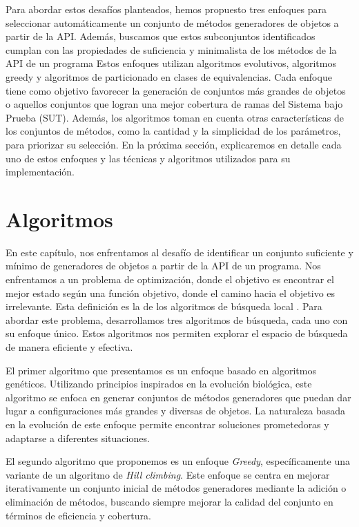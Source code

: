 Para abordar estos desafíos planteados, hemos propuesto tres enfoques para seleccionar automáticamente un conjunto de métodos generadores de objetos a partir de la API. Además, buscamos que estos subconjuntos identificados cumplan con las propiedades de suficiencia y minimalista de los métodos de la API de un programa  Estos enfoques utilizan algoritmos evolutivos, algoritmos greedy y algoritmos de particionado en clases de equivalencias. Cada enfoque tiene como objetivo favorecer la generación de conjuntos más grandes de objetos o aquellos conjuntos que logran una mejor cobertura de ramas del Sistema bajo Prueba (SUT). Además, los algoritmos toman en cuenta otras características de los conjuntos de métodos, como la cantidad y la simplicidad de los parámetros, para priorizar su selección. En la próxima sección, explicaremos en detalle cada uno de estos enfoques y las técnicas y algoritmos utilizados para su implementación.


\section{Algoritmos}
\label{sec:algorithms}


En este capítulo, nos enfrentamos al desafío de identificar un conjunto suficiente y mínimo de generadores de objetos a partir de la API de un programa. Nos enfrentamos a un problema de optimización, donde el objetivo es encontrar el mejor estado según una función objetivo, donde el camino hacia el objetivo es irrelevante. Esta definición es la de los algoritmos de búsqueda local \cite{Russell:2009}. Para abordar este problema, desarrollamos tres algoritmos de búsqueda, cada uno con su enfoque único. Estos algoritmos nos permiten explorar el espacio de búsqueda de manera eficiente y efectiva.

El primer algoritmo que presentamos es un enfoque basado en algoritmos genéticos. Utilizando principios inspirados en la evolución biológica, este algoritmo se enfoca en generar conjuntos de métodos generadores que puedan dar lugar a configuraciones más grandes y diversas de objetos. La naturaleza basada en la evolución de este enfoque permite encontrar soluciones prometedoras y adaptarse a diferentes situaciones.

El segundo algoritmo que proponemos es un enfoque \emph{Greedy}, específicamente una variante de un algoritmo de \emph{Hill climbing}. Este enfoque se centra en mejorar iterativamente un conjunto inicial de métodos generadores mediante la adición o eliminación de métodos, buscando siempre mejorar la calidad del conjunto en términos de eficiencia y cobertura.

